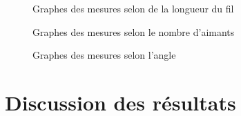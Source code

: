 \documentclass[11pt]{article}
\begin{document}
    \begin{figure}[H]
        \centering
        
        \caption{Graphes des mesures selon de la longueur du fil}
        \label{fig:longueur}
    \end{figure}

    \begin{figure}[H]
        \centering
        
        \caption{Graphes des mesures selon le nombre d'aimants}
        \label{fig:aimants}
    \end{figure}

    \begin{figure}[H]
        \hfill
        \caption{Graphes des mesures selon l'angle}
        \label{fig:angle}
    \end{figure}

    \section{Discussion des résultats}\label{sec:discussion-des-resultats}
\end{document}
